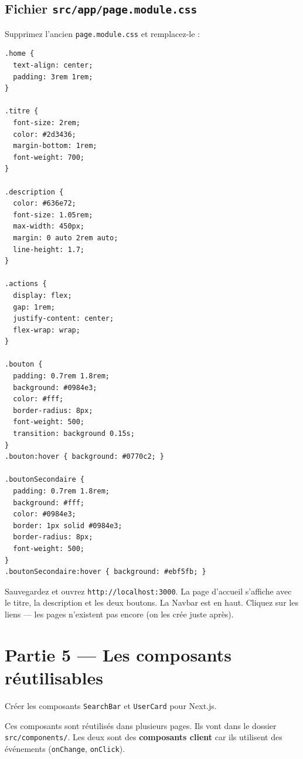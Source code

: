 \documentclass[11pt,a4paper]{article}
\begin{document}
\subsection{Fichier \texttt{src/app/page.module.css}}

Supprimez l'ancien \texttt{page.module.css} et remplacez-le :

\begin{lstlisting}[style=css]
.home {
  text-align: center;
  padding: 3rem 1rem;
}

.titre {
  font-size: 2rem;
  color: #2d3436;
  margin-bottom: 1rem;
  font-weight: 700;
}

.description {
  color: #636e72;
  font-size: 1.05rem;
  max-width: 450px;
  margin: 0 auto 2rem auto;
  line-height: 1.7;
}

.actions {
  display: flex;
  gap: 1rem;
  justify-content: center;
  flex-wrap: wrap;
}

.bouton {
  padding: 0.7rem 1.8rem;
  background: #0984e3;
  color: #fff;
  border-radius: 8px;
  font-weight: 500;
  transition: background 0.15s;
}
.bouton:hover { background: #0770c2; }

.boutonSecondaire {
  padding: 0.7rem 1.8rem;
  background: #fff;
  color: #0984e3;
  border: 1px solid #0984e3;
  border-radius: 8px;
  font-weight: 500;
}
.boutonSecondaire:hover { background: #ebf5fb; }
\end{lstlisting}

\begin{objectifbox}[Vérification]
Sauvegardez et ouvrez \texttt{http://localhost:3000}. La page d'accueil s'affiche avec le titre, la description et les deux boutons. La Navbar est en haut. Cliquez sur les liens --- les pages n'existent pas encore (on les crée juste après).
\end{objectifbox}

\section{Partie 5 --- Les composants réutilisables}

\begin{objectifbox}
Créer les composants \texttt{SearchBar} et \texttt{UserCard} pour Next.js.
\end{objectifbox}

Ces composants sont réutilisés dans plusieurs pages. Ils vont dans le dossier \texttt{src/components/}. Les deux sont des \textbf{composants client} car ils utilisent des événements (\texttt{onChange}, \texttt{onClick}).
\end{document}
